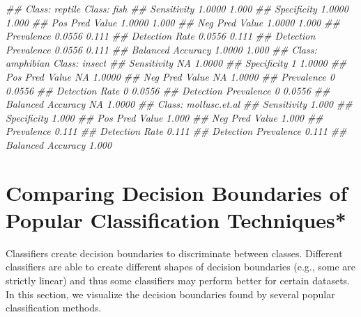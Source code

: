 \documentclass[
  notitlepage]{book}
\newenvironment{Shaded}{\begin{snugshade}}{\end{snugshade}}
\newcommand{\CommentTok}[1]{\textcolor[rgb]{0.56,0.35,0.01}{\textit{#1}}}
\begin{document}
\begin{Shaded}
\begin{Highlighting}[]
\CommentTok{\#\#                      Class: reptile Class: fish}
\CommentTok{\#\# Sensitivity                  1.0000       1.000}
\CommentTok{\#\# Specificity                  1.0000       1.000}
\CommentTok{\#\# Pos Pred Value               1.0000       1.000}
\CommentTok{\#\# Neg Pred Value               1.0000       1.000}
\CommentTok{\#\# Prevalence                   0.0556       0.111}
\CommentTok{\#\# Detection Rate               0.0556       0.111}
\CommentTok{\#\# Detection Prevalence         0.0556       0.111}
\CommentTok{\#\# Balanced Accuracy            1.0000       1.000}
\CommentTok{\#\#                      Class: amphibian Class: insect}
\CommentTok{\#\# Sensitivity                        NA        1.0000}
\CommentTok{\#\# Specificity                         1        1.0000}
\CommentTok{\#\# Pos Pred Value                     NA        1.0000}
\CommentTok{\#\# Neg Pred Value                     NA        1.0000}
\CommentTok{\#\# Prevalence                          0        0.0556}
\CommentTok{\#\# Detection Rate                      0        0.0556}
\CommentTok{\#\# Detection Prevalence                0        0.0556}
\CommentTok{\#\# Balanced Accuracy                  NA        1.0000}
\CommentTok{\#\#                      Class: mollusc.et.al}
\CommentTok{\#\# Sensitivity                         1.000}
\CommentTok{\#\# Specificity                         1.000}
\CommentTok{\#\# Pos Pred Value                      1.000}
\CommentTok{\#\# Neg Pred Value                      1.000}
\CommentTok{\#\# Prevalence                          0.111}
\CommentTok{\#\# Detection Rate                      0.111}
\CommentTok{\#\# Detection Prevalence                0.111}
\CommentTok{\#\# Balanced Accuracy                   1.000}
\end{Highlighting}
\end{Shaded}

\hypertarget{comparing-decision-boundaries-of-popular-classification-techniques}{%
\section{Comparing Decision Boundaries of Popular Classification Techniques*}\label{comparing-decision-boundaries-of-popular-classification-techniques}}

Classifiers create decision boundaries to discriminate between classes.
Different classifiers are able to create different shapes of decision
boundaries (e.g., some are strictly linear) and thus some classifiers
may perform better for certain datasets. In this section, we visualize the
decision boundaries found by several popular classification methods.
\end{document}
